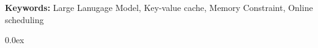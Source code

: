 \documentclass{article}
\let\enotesize=\normalsize
\begin{document}







\begin{abstract}

\end{abstract}
\noindent\textbf{Keywords:} Large Lanugage Model, Key-value cache, Memory Constraint, Online scheduling

















\begingroup \parindent 0pt \parskip 0.0ex \def\enotesize{\normalsize} \theendnotes \endgroup

%
%
%
\end{document}
